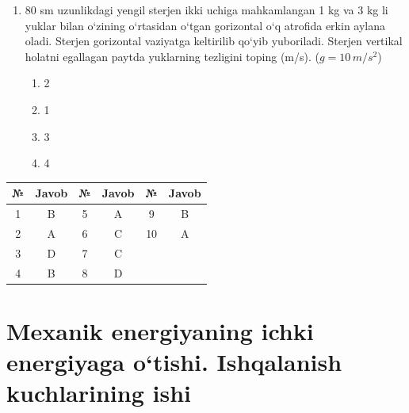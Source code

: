 \begin{enumerate}
\item 80 sm uzunlikdagi yengil sterjen ikki uchiga mahkamlangan 1 kg va 3 kg li yuklar bilan o‘zining o‘rtasidan o‘tgan gorizontal o‘q atrofida erkin aylana oladi. Sterjen gorizontal vaziyatga keltirilib qo‘yib yuboriladi. Sterjen vertikal holatni egallagan paytda yuklarning tezligini toping (m/s). ($g = 10 \, m/s^2$)
\begin{enumerate}[label=\Alph*)]
\item 2
\item 1
\item 3
\item 4
\end{enumerate}

\end{enumerate}



\begin{table}[h!]
\centering
\begin{tabular}{|c|c|c|c|c|c|}
\hline
\textbf{№} & \textbf{Javob} & \textbf{№} & \textbf{Javob} & \textbf{№} & \textbf{Javob} \\ \hline
1 & B  & 5 & A  & 9 & B  \\ \hline
2 & A  & 6 & C  & 10 & A  \\ \hline
3 & D  & 7 & C  & & \\ \hline
4 & B  & 8 & D  & & \\ \hline
\end{tabular}
\end{table}





\section{Mexanik energiyaning ichki energiyaga o‘tishi. Ishqalanish kuchlarining ishi}

